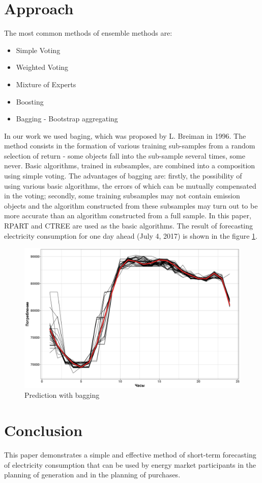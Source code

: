 \documentclass[11pt]{article}
\begin{document}
\section{Approach}
\label{sec:methods}
The most common methods of ensemble methods are:
\begin{itemize}
    \item Simple Voting
    \item Weighted Voting
    \item Mixture of Experts
    \item Boosting
    \item Bagging - Bootstrap aggregating \cite{Breiman1996}
\end{itemize}
In our work we used baging, which was proposed by L. Breiman in 1996. The method consists in the formation of various training sub-samples from a random selection of return - some objects fall into the sub-sample several times, some never. Basic algorithms, trained in subsamples, are combined into a composition using simple voting. The advantages of bagging are: firstly, the possibility of using various basic algorithms, the errors of which can be mutually compensated in the voting; secondly, some training subsamples may not contain emission objects and the algorithm constructed from these subsamples may turn out to be more accurate than an algorithm constructed from a full sample. In this paper, RPART and CTREE are used as the basic algorithms. The result of forecasting electricity consumption for one day ahead (July 4, 2017) is shown in the figure \ref{fig:prediction}.
\begin{figure}
  \centering
  \includegraphics[width=0.6\linewidth]{prediction.jpg}
  \caption{Prediction with bagging}
  \label{fig:prediction}
\end{figure}



\section{Conclusion}
This paper demonstrates a simple and effective method of short-term forecasting of electricity consumption that can be used by energy market participants in the planning of generation and in the planning of purchases.
\end{document}

